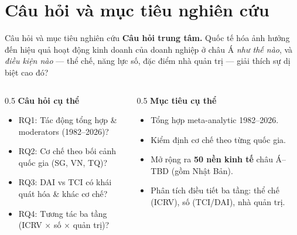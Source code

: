 \documentclass[aspectratio=169,11pt]{beamer}
\newcommand{\hl}[1]{\textcolor{accent2}{\textbf{#1}}}
\begin{document}
\section{Câu hỏi và mục tiêu nghiên cứu}
\begin{frame}{Câu hỏi và mục tiêu nghiên cứu}
  \textbf{Câu hỏi trung tâm.} Quốc tế hóa ảnh hưởng đến hiệu quả hoạt động kinh doanh của doanh nghiệp ở châu Á \emph{như thế nào}, và \emph{điều kiện nào} --- thể chế, năng lực số, đặc điểm nhà quản trị --- giải thích sự dị biệt cao đó?
  \vspace{0.3em}
  \begin{columns}[T]
    \begin{column}{0.5\textwidth}
      \textbf{Câu hỏi cụ thể}
      \begin{itemize}\small
        \item RQ1: Tác động tổng hợp \& moderators (1982--2026)?
        \item RQ2: Cơ chế theo bối cảnh quốc gia (SG, VN, TQ)?
        \item RQ3: DAI vs TCI có khái quát hóa \& khác cơ chế?
        \item RQ4: Tương tác ba tầng (ICRV $\times$ số $\times$ quản trị)?
      \end{itemize}
    \end{column}
    \begin{column}{0.5\textwidth}
      \textbf{Mục tiêu cụ thể}
      \begin{itemize}\small
        \item Tổng hợp meta-analytic 1982--2026.
        \item Kiểm định cơ chế theo từng quốc gia.
        \item Mở rộng ra \hl{50 nền kinh tế} châu Á--TBD (gồm Nhật Bản).
        \item Phân tích điều tiết ba tầng: thể chế (ICRV), số (TCI/DAI), nhà quản trị.
      \end{itemize}
    \end{column}
  \end{columns}
\end{frame}

\end{document}
